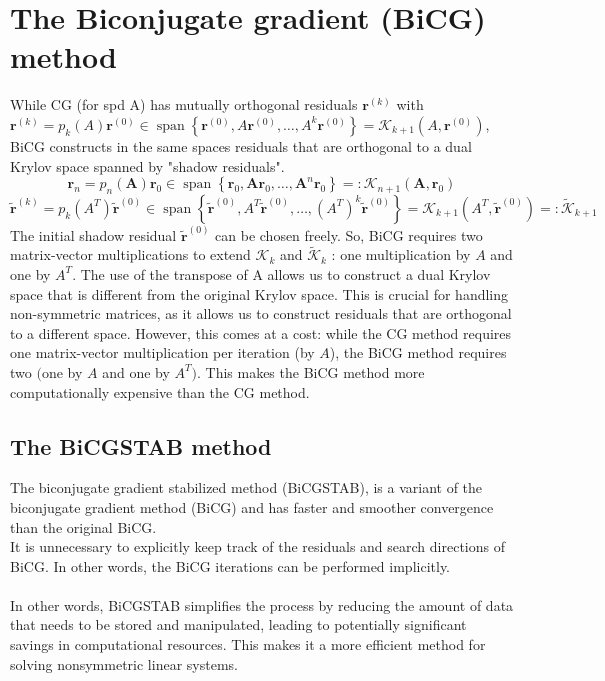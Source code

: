 \documentclass[11pt]{book}
\begin{document}
\section*{The Biconjugate gradient (BiCG) method}
While CG (for spd A) has mutually orthogonal residuals $\mathbf{r}^{(k)}$ with $\mathbf{r}^{(k)}=p_{k}(A) \mathbf{r}^{(0)} \in \operatorname{span}\left\{\mathbf{r}^{(0)}, A \mathbf{r}^{(0)}, \ldots, A^{k} \mathbf{r}^{(0)}\right\}=\mathscr{K}_{k+1}\left(A, \mathbf{r}^{(0)}\right)$, BiCG constructs in the same spaces residuals that are orthogonal to a dual Krylov space spanned by "shadow residuals".
$$\mathbf{r}_n=p_n(\mathbf{A}) \mathbf{r}_0 \in \operatorname{span}\left\{\mathbf{r}_0, \mathbf{A r}_0, \ldots, \mathbf{A}^n \mathbf{r}_0\right\}=: \mathcal{K}_{n+1}\left(\mathbf{A}, \mathbf{r}_0\right)$$
$$
\tilde{\mathbf{r}}^{(k)}=p_{k}\left(A^{T}\right) \tilde{\mathbf{r}}^{(0)} \in \operatorname{span}\left\{\tilde{\mathbf{r}}^{(0)}, A^{T} \tilde{\mathbf{r}}^{(0)}, \ldots,\left(A^{T}\right)^{k} \tilde{\mathbf{r}}^{(0)}\right\}=\mathscr{K}_{k+1}\left(A^{T}, \tilde{\mathbf{r}}^{(0)}\right) =: \tilde{\mathscr{K}}_{k+1}
$$
The initial shadow residual $\tilde{\mathbf{r}}^{(0)}$ can be chosen freely. So, BiCG requires two matrix-vector multiplications to extend $\mathscr{K}_{k}$ and $\tilde{\mathscr{K}}_{k}$ : one multiplication by $A$ and one by $A^{T}$. 
The use of the transpose of A allows us to construct a dual Krylov space that is different from the original Krylov space. This is crucial for handling non-symmetric matrices, as it allows us to construct residuals that are orthogonal to a different space.
However, this comes at a cost: while the CG method requires one matrix-vector multiplication per iteration (by $A$), the BiCG method requires two $\bigl( $one by $A$ and one by $A^T \bigl)$. This makes the BiCG method more computationally expensive than the CG method.
\subsection*{The BiCGSTAB method}
The biconjugate gradient stabilized method (BiCGSTAB), is a variant of the biconjugate gradient method (BiCG) and has faster and smoother convergence than the original BiCG.\\
It is unnecessary to explicitly keep track of the residuals and search directions of BiCG. In other words, the BiCG iterations can be performed implicitly. \\ \\
In other words, BiCGSTAB simplifies the process by reducing the amount of data that needs to be stored and manipulated, leading to potentially significant savings in computational resources. This makes it a more efficient method for solving nonsymmetric linear systems. \\ \\
\end{document}
